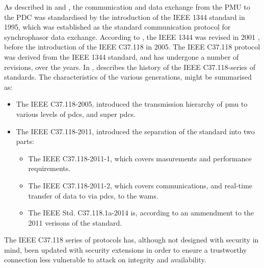 As described in \cite{martin2014overview} and \cite{ali2016performance}, the communication and data exchange from the PMU to the PDC was standardised by the introduction of the IEEE 1344 standard in 1995, which was established as the standard communication protocol for synchrophasor data exchange. According to \cite{appasani2018review}, the IEEE 1344 was revised in 2001 , before the introduction of the IEEE C37.118 in 2005. The  IEEE C37.118 protocol was derived from the IEEE 1344 standard, and has undergone a number of revisions, over the years.
In \cite{martin2014overview}, \citeauthor{martin2014overview} describes the history of the 
IEEE C37.118-series of standards. The characteristics of the various generations, might be summarised as:
\begin{itemize}
 
    \item The IEEE C37.118-2005, introduced the transmission hierarchy of  \acrshort{pmu} to various levels of \acrshort{pdc}s, and super \acrshort{pdc}s.
    \item The IEEE C37.118-2011, introduced the separation of the standard into two parts:
    \begin{itemize}
    \item The IEEE C37.118-2011-1, which covers masurements and performance requirements.
    \item The IEEE C37.118-2011-2, which covers communications, and real-time transfer of data to via \acrshort{pdc}s, to the \acrshort{wams}.  
    \item The  IEEE Std. C37.118.1a-2014 is, according to \Cite{schofield2018design} an ammendment to the 2011 verisons of the standard. 
    \end{itemize}
\end{itemize}

The IEEE C37.118 series of protocols has, although not designed with security in mind, been updated with security extensions in order to ensure a trustworthy connection less vulnerable to attack on integrity and availability. 

  